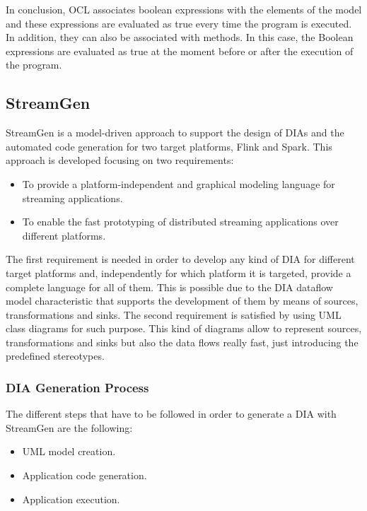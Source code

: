 In conclusion, OCL associates boolean expressions with the elements of the model and these expressions are evaluated as true every time the program is executed. In addition, they can also be associated with methods. In this case, the Boolean expressions are evaluated as true at the moment before or after the execution of the program.

\subsection{StreamGen} %
StreamGen is a model-driven approach to support the design of DIAs and the automated code generation for two target platforms, Flink and Spark. This approach is developed focusing on two requirements:

\begin{itemize}
\item To provide a platform-independent and graphical modeling language for streaming applications.
\item To enable the fast prototyping of distributed streaming applications over different platforms.
\end{itemize}

The first requirement is needed in order to develop any kind of DIA for different target platforms and, independently for which platform it is targeted, provide a complete language for all of them. This is possible due to the DIA dataflow model characteristic that supports the development of them by means of sources, transformations and sinks. The second requirement is satisfied by using UML class diagrams for such purpose. This kind of diagrams allow to represent sources, transformations and sinks but also the data flows really fast, just introducing the predefined stereotypes.

\subsubsection{DIA Generation Process}

The different steps that have to be followed in order to generate a DIA with StreamGen are the following:

\begin{itemize}
\item UML model creation.
\item Application code generation.
\item Application execution.
\end{itemize}

